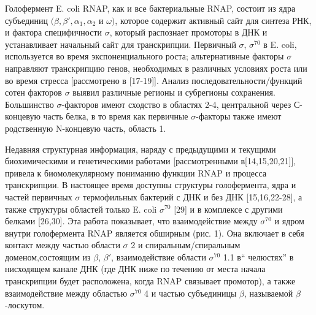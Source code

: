 \documentclass[a4paper,12pt]{article}
\begin{document}
        \par{Голофермент E. coli RNAP, как и все бактериальные RNAP, состоит из ядра субъединиц
        \((\beta,\beta',\alpha_1,\alpha_2\) и \(\omega)\), которое содержит активный сайт для синтеза РНК, и фактора
        специфичности \(\sigma\), который распознает промоторы в ДНК и устанавливает начальный сайт для транскрипции.
        Первичный \(\sigma\), \(\sigma^{70}\) в E. coli, используется во время экспоненциального роста; альтернативные
        факторы \(\sigma\) направляют транскрипцию генов, необходимых в различных условиях роста или во время стресса
        [рассмотрено в [17-19]]. Анализ последовательности/функций сотен факторов \(\sigma\) выявил различные регионы и
        субрегионы сохранения. Большинство \(\sigma\)-факторов имеют сходство в областях 2-4, центральной через С-концевую
        часть белка, в то время как первичные \(\sigma\)-факторы также имеют родственную N-концевую часть, область 1.}
        \par{Недавняя структурная информация, наряду с предыдущими и текущими биохимическими и генетическими работами
        [рассмотренными в[14,15,20,21]], привела к биомолекулярному пониманию функции RNAP и процесса транскрипции. В
        настоящее время доступны структуры голофермента, ядра и частей первичных \(\sigma\) термофильных бактерий с ДНК и без
        ДНК [15,16,22-28], а также структуры областей только E. coli \(\sigma^{70}\) [29] и в комплексе с другими белками
        [26,30]. Эта работа показывает, что взаимодействие между \(\sigma^{70}\) и ядром внутри голофермента RNAP является
        обширным (рис. 1). Она включает в себя контакт между частью области \(\sigma\) 2 и спиральным/спиральным
        доменом,состоящим из \(\beta\), \(\beta'\), взаимодействие области \(\sigma^{70}\) 1.1 в“ челюстях” в нисходящем
        канале ДНК (где ДНК ниже по течению от места начала транскрипции будет расположена, когда RNAP связывает промотор), а
        также взаимодействие между областью \(\sigma^{70}\) 4 и частью субъединицы \(\beta\), называемой \(\beta\)-лоскутом.}
\end{document}
